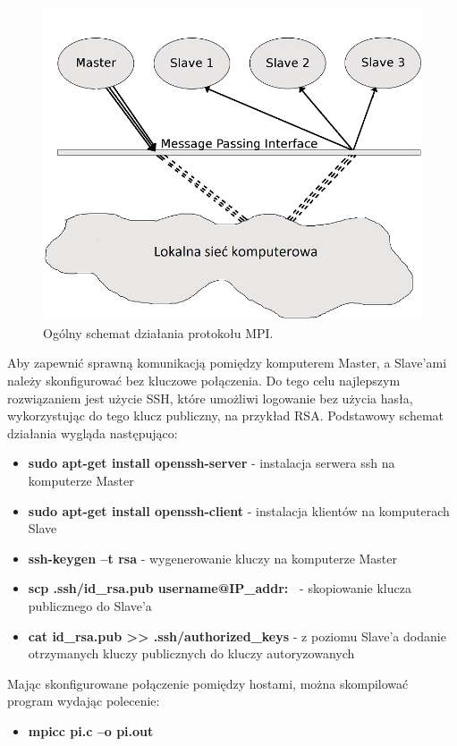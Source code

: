 \documentclass[a4paper,12pt]{article}		%
\begin{document}
\begin{figure}[h!]
\centering
\includegraphics[scale=0.6]{Resources/mpi.jpg}
\caption{Ogólny schemat działania protokołu MPI.} 
\end{figure}

Aby zapewnić sprawną komunikacją pomiędzy komputerem Master, a Slave’ami należy skonfigurować bez kluczowe połączenia. Do tego celu najlepszym rozwiązaniem jest użycie SSH, które umożliwi logowanie bez użycia hasła, wykorzystując do tego klucz publiczny, na przykład RSA. Podstawowy schemat działania wygląda następująco:
\begin{itemize}
\item \textbf{sudo apt-get install openssh-server} - instalacja serwera ssh na komputerze Master
\item \textbf{sudo apt-get install openssh-client} - instalacja klientów na komputerach Slave
\item \textbf{ssh-keygen –t rsa} - wygenerowanie kluczy na komputerze Master
\item \textbf{scp .ssh/id\_rsa.pub username@IP\_addr:~} - skopiowanie klucza publicznego do Slave'a
\item \textbf{cat id\_rsa.pub >> .ssh/authorized\_keys} - z poziomu Slave'a dodanie otrzymanych kluczy publicznych do  kluczy autoryzowanych
\end{itemize}

Mając skonfigurowane połączenie pomiędzy hostami, można skompilować program wydając polecenie: 

\begin{itemize}
\item \textbf{mpicc pi.c –o pi.out}
\end{itemize}
\end{document}
